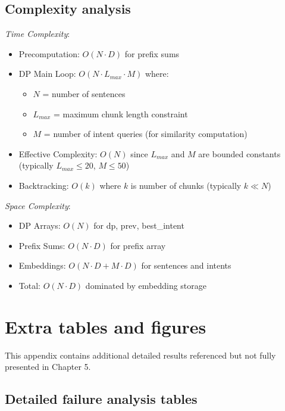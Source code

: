 \documentclass[12pt,a4paper]{report}
\begin{document}
\section{Complexity analysis}

\emph{Time Complexity}:
\begin{itemize}
\item Precomputation: $O(N \cdot D)$ for prefix sums
\item DP Main Loop: $O(N \cdot L_{max} \cdot M)$ where:
  \begin{itemize}
  \item $N$ = number of sentences
  \item $L_{max}$ = maximum chunk length constraint
  \item $M$ = number of intent queries (for similarity computation)
  \end{itemize}
\item Effective Complexity: $O(N)$ since $L_{max}$ and $M$ are bounded constants (typically $L_{max} \leq 20$, $M \leq 50$)
\item Backtracking: $O(k)$ where $k$ is number of chunks (typically $k \ll N$)
\end{itemize}

\emph{Space Complexity}:
\begin{itemize}
\item DP Arrays: $O(N)$ for dp, prev, best\_intent
\item Prefix Sums: $O(N \cdot D)$ for prefix array
\item Embeddings: $O(N \cdot D + M \cdot D)$ for sentences and intents
\item Total: $O(N \cdot D)$ dominated by embedding storage
\end{itemize}

\chapter{Extra tables and figures}

This appendix contains additional detailed results referenced but not fully presented in Chapter 5.

\section{Detailed failure analysis tables}
\end{document}
